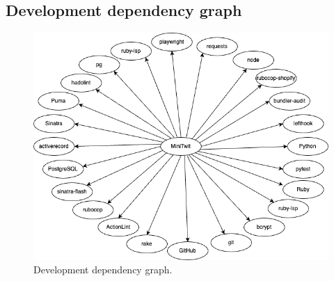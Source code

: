 \documentclass{article}
\begin{document}
\subsection{Development dependency graph} \label{appendix: dev-dependecies}
\begin{figure}[H]
    \centering
    \includegraphics[width=\textwidth]{images/dependency-graph-dev.png}
    \caption{Development dependency graph.}
    \label{fig:dep-dev}
\end{figure}
\end{document}
